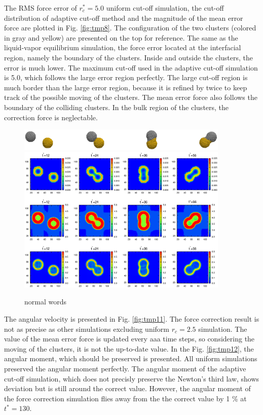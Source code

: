 \documentclass[aps,pre,preprint]{revtex4}
\newcommand{\recheck}[1]{{\color{red} #1}}
\begin{document}
The RMS force error of $r_c^\ast = 5.0$ uniform cut-off simulation,
the cut-off distribution of adaptive cut-off method and the magnitude
of the mean error force are plotted in Fig. \ref{fig:tmp8}.  The
configuration of the two clusters (colored in gray and yellow) are
presented on the top for reference. The same as the liquid-vapor
equilibrium simulation, the force error located at the interfacial
region, namely the boundary of the clusters. Inside and outside the
clusters, the error is much lower.  The maximum cut-off used in the
adaptive cut-off simulation is 5.0, which follows the large error
region perfectly. The large cut-off region is much border than the
large error region, because it is refined by twice to keep track of
the possible moving of the clusters.  The mean error force also
follows the boundary of the colliding clusters. In the bulk region
of the clusters, the correction force is neglectable.

\begin{figure}
  \centering
  \includegraphics[width=0.90\textwidth]{fig/error-rcut-ball.eps} 
  \includegraphics[width=0.90\textwidth]{fig/error-rcut.eps}
  \caption{normal words}
  \label{fig:tmp10}
\end{figure}


The angular velocity is presented in Fig. \ref{fig:tmp11}. The force
correction result is not as precise as other simulations excluding
uniform $r_c = 2.5$ simulation.  The value of the mean error force is
updated every \recheck{aaa} time steps, so considering the moving of the clusters,
it is not the up-to-date value.
In the Fig. \ref{fig:tmp12}, the angular moment, which should be
preserved is presented. All uniform simulations preserved the angular
moment perfectly. The angular moment of the adaptive cut-off
simulation, which does not precisly preserve the Newton's third law,
shows deviation but is still around the correct value. However, the
angular moment of the force correction simulation flies away from the
the correct value by 1 \% at $t^\ast = 130$.
\end{document}
